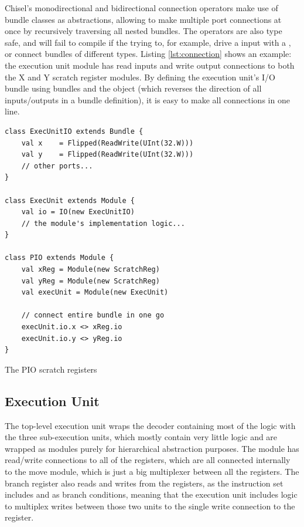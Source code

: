 Chisel's monodirectional \txt{:=} and bidirectional \txt{<>} connection operators make use of bundle classes as abstractions, allowing to make multiple port connections at once by recursively traversing all nested bundles. The operators are also type safe, and will fail to compile if the trying to, for example, drive a  input with a , or connect bundles of different types. Listing \ref{lst:connection} shows an example: the execution unit module has read inputs and write output connections to both the X and Y scratch register modules. By defining the execution unit's I/O bundle using  bundles and the  object (which reverses the direction of all inputs/outputs in a bundle definition), it is easy to make all connections in one line.

\begin{listing}[h!]
    \vspace{0.5cm}
    \begin{verbatim}
class ExecUnitIO extends Bundle {
    val x    = Flipped(ReadWrite(UInt(32.W)))
    val y    = Flipped(ReadWrite(UInt(32.W)))
    // other ports...          
}

class ExecUnit extends Module {
    val io = IO(new ExecUnitIO)
    // the module's implementation logic...
}

class PIO extends Module {
    val xReg = Module(new ScratchReg)
    val yReg = Module(new ScratchReg)
    val execUnit = Module(new ExecUnit)

    // connect entire bundle in one go
    execUnit.io.x <> xReg.io
    execUnit.io.y <> yReg.io
}
    \end{verbatim}
    \caption{The PIO scratch registers}
    \label{lst:connection}
\end{listing}

\subsection{Execution Unit}

The top-level execution unit wraps the decoder containing most of the logic with the three sub-execution units, which mostly contain very little logic and are wrapped as modules purely for hierarchical abstraction purposes. The module has read/write connections to all of the registers, which are all connected internally to the move module, which is just a big multiplexer between all the registers. The branch register also reads and writes from the registers, as the instruction set includes  and  as branch conditions, meaning that the execution unit includes logic to multiplex writes between those two units to the single write connection to the register.

